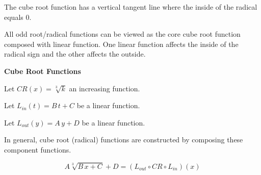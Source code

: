 \documentclass{ximera}
\begin{document}
The cube root function has a vertical tangent line where the inside of the radical equals $0$.






































All odd root/radical functions can be viewed as the core cube root function composed with linear function. One linear function affects the inside of the radical sign and the other affects the outside.


\begin{idea} \textbf{\textcolor{blue!55!black}{Cube Root Functions}} 


Let $CR(x) = \sqrt[3]{k}$ an increasing function.

Let $L_{in}(t) = B \, t + C$ be a linear function.

Let $L_{out}(y) = A \, y + D$ be a linear function.


In general, cube root (radical) functions are constructed by composing these component functions.


\[
A \sqrt[3]{B \,x + C} + D = (L_{out} \circ CR \circ L_{in})(x)
\]


\end{idea}
\end{document}

